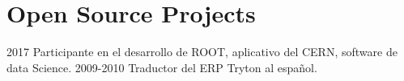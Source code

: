 \section{Open Source Projects}

\begin{entrylist}
  \entry
	{2017}
	{Participante en el desarrollo de ROOT, aplicativo del CERN, software de data Science.}
	{}{}
  \entry
        {2009-2010}
	{Traductor del ERP Tryton al español.}
	{}{}
\end{entrylist}
